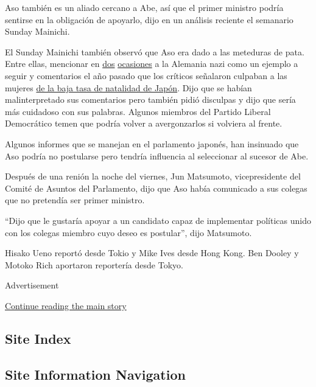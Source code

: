 Aso también es un aliado cercano a Abe, así que el primer ministro
podría sentirse en la obligación de apoyarlo, dijo en un análisis
reciente el semanario Sunday Mainichi.

El Sunday Mainichi también observó que Aso era dado a las meteduras de
pata. Entre ellas, mencionar en
\href{https://www.nytimes3xbfgragh.onion/2013/08/02/world/asia/japans-finance-minister-retracts-statement-on-nazis.html}{dos}
\href{https://www.theguardian.com/world/2017/aug/30/japan-minister-tara-aso-praises-hitler-right-motives}{ocasiones}
a la Alemania nazi como un ejemplo a seguir y comentarios el año pasado
que los críticos señalaron culpaban a las mujeres
\href{https://www.nytimes3xbfgragh.onion/2019/02/05/world/asia/japan-population-women-children.html}{de
la baja tasa de natalidad de Japón}. Dijo que se habían malinterpretado
sus comentarios pero también pidió disculpas y dijo que sería más
cuidadoso con sus palabras. Algunos miembros del Partido Liberal
Democrático temen que podría volver a avergonzarlos si volviera al
frente.

Algunos informes que se manejan en el parlamento japonés, han insinuado
que Aso podría no postularse pero tendría influencia al seleccionar al
sucesor de Abe.

Después de una renión la noche del viernes, Jun Matsumoto,
vicepresidente del Comité de Asuntos del Parlamento, dijo que Aso había
comunicado a sus colegas que no pretendía ser primer ministro.

``Dijo que le gustaría apoyar a un candidato capaz de implementar
políticas unido con los colegas miembro cuyo deseo es postular'', dijo
Matsumoto.

Hisako Ueno reportó desde Tokio y Mike Ives desde Hong Kong. Ben Dooley
y Motoko Rich aportaron reportería desde Tokyo.

Advertisement

\protect\hyperlink{after-bottom}{Continue reading the main story}

\hypertarget{site-index}{%
\subsection{Site Index}\label{site-index}}

\hypertarget{site-information-navigation}{%
\subsection{Site Information
Navigation}\label{site-information-navigation}}

